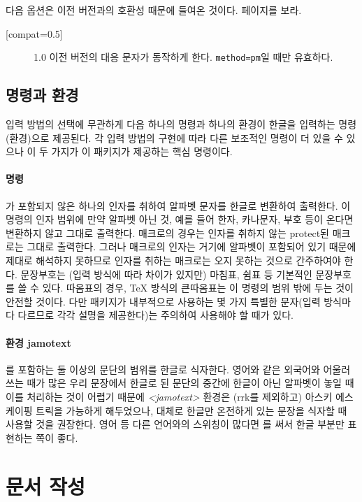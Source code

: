 \documentclass[a4paper,chapter]{oblivoir}
\newcommand\env[1]{%
	\textit{<#1>}\index{환경!#1}\index{#1}%
}
\begin{document}
다음 옵션은 이전 버전과의 호환성 때문에 들여온 것이다. \pageref{sec:compat}페이지를 보라.
\begin{description}
	\item[\ttfamily [compat=0.5{]}] 1.0 이전 버전의 대응 문자가 동작하게 한다. \texttt{method=pm}일 때만 유효하다.
\end{description}

\subsection{명령과 환경}

입력 방법의 선택에 무관하게 다음 하나의 명령과 하나의 환경이 한글을 입력하는
명령(환경)으로 제공된다. 각 입력 방법의 구현에 따라 다른 보조적인 명령이 더
있을 수 있으나 이 두 가지가 이 패키지가 제공하는 핵심 명령이다.

\paragraph{명령 \ttfamily {}}
가 포함되지 않은 하나의 인자를 취하여 알파벳 문자를 한글로 변환하여
출력한다. 이 명령의 인자 범위에 만약 알파벳 아닌 것, 예를 들어 한자, 카나문자, 부호 등이 온다면 변환하지 않고 그대로 출력한다. 매크로의 경우는 인자를 취하지 않는 protect된 매크로는 그대로 출력한다. 그러나 매크로의 인자는 거기에 알파벳이 포함되어 있기 때문에 제대로 해석하지 못하므로 인자를 취하는 매크로는 오지 못하는 것으로 간주하여야 한다.
문장부호는 (입력 방식에 따라 차이가 있지만) 마침표, 쉼표 등 기본적인 문장부호를 쓸 수 있다. 따옴표의 경우, \TeX{} 방식의 큰따옴표는 이 명령의 범위 밖에 두는 것이 안전할 것이다. 다만 패키지가 내부적으로 사용하는 몇 가지 특별한 문자(입력 방식마다 다르므로 각각 설명을 제공한다)는 주의하여 사용해야 할 때가 있다.

\paragraph{환경 \ttfamily jamotext}
를 포함하는 둘 이상의 문단의 범위를 한글로 식자한다.
영어와 같은 외국어와 어울러쓰는 때가 많은 우리 문장에서 한글로 된 문단의 중간에 한글이 아닌 알파벳이 놓일 때 이를 처리하는 것이 어렵기 때문에 \env{jamotext} 환경은
(rrk를 제외하고) 아스키 에스케이핑 트릭을 가능하게 해두었으나, 대체로 한글만
온전하게 있는 문장을 식자할 때 사용할 것을 권장한다. 영어 등 다른 언어와의 스위칭이
많다면 를 써서 한글 부분만 표현하는 쪽이 좋다.

\section{문서 작성}
\end{document}
